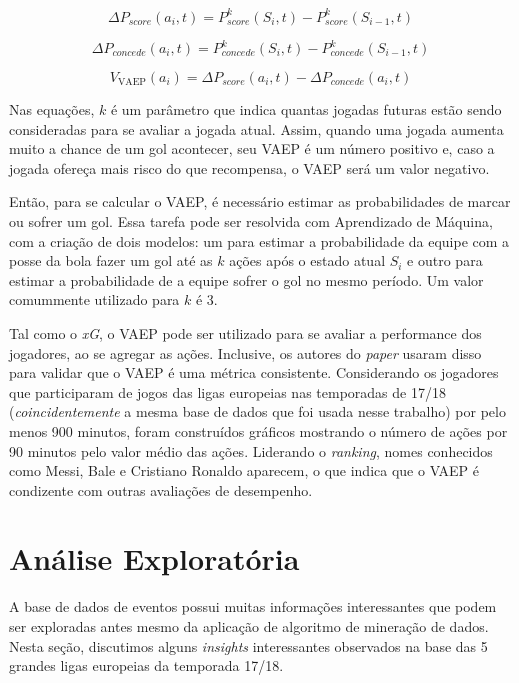\documentclass{article}
\begin{document}
\begin{equation}
	\Delta P_{score}(a_i,t) = P^k_{score}(S_i,t) - P^k_{score}(S_{i-1},t)
	\label{eq:vaep_scores}
\end{equation}

\begin{equation}
	\Delta P_{concede}(a_i,t) = P^k_{concede}(S_i,t) - P^k_{concede}(S_{i-1},t)
	\label{eq:vaep_concedes}
\end{equation}

\begin{equation}
	V_{\textrm{VAEP}}(a_i) = \Delta P_{score}(a_i,t) - \Delta P_{concede}(a_i,t) 
	\label{eq:vaep}
\end{equation}

Nas equações, $k$ é um parâmetro que indica quantas jogadas futuras estão sendo
consideradas para se avaliar a jogada atual. Assim, quando uma jogada aumenta
muito a chance de um gol acontecer, seu VAEP é um número positivo e, caso a
jogada ofereça mais risco do que recompensa, o VAEP será um valor negativo.

Então, para se calcular o VAEP, é necessário estimar as probabilidades de marcar
ou sofrer um gol. Essa tarefa pode ser resolvida com Aprendizado de Máquina, com
a criação de dois modelos: um para estimar a probabilidade da equipe com a posse
da bola fazer um gol até as $k$ ações após o estado atual $S_i$ e outro para
estimar a probabilidade de a equipe sofrer o gol no mesmo período. Um valor
comummente utilizado para $k$ é 3.

Tal como o \textit{xG}, o VAEP pode ser utilizado para se avaliar a performance
dos jogadores, ao se agregar as ações. Inclusive, os autores do \textit{paper}
usaram disso para validar que o VAEP é uma métrica consistente. Considerando os
jogadores que participaram de jogos das ligas europeias nas temporadas de 17/18
(\textit{coincidentemente} a mesma base de dados que foi usada nesse trabalho)
por pelo menos 900 minutos, foram construídos gráficos mostrando o número de
ações por 90 minutos pelo valor médio das ações. Liderando o \textit{ranking},
nomes conhecidos como Messi, Bale e Cristiano Ronaldo aparecem, o que indica que
o VAEP é condizente com outras avaliações de desempenho.

\section{Análise Exploratória}

A base de dados de eventos possui muitas informações interessantes que podem
ser exploradas antes mesmo da aplicação
de algoritmo de mineração de dados. Nesta seção, discutimos alguns
\textit{insights} interessantes observados na base das 5 grandes ligas
europeias da temporada 17/18.
\end{document}
